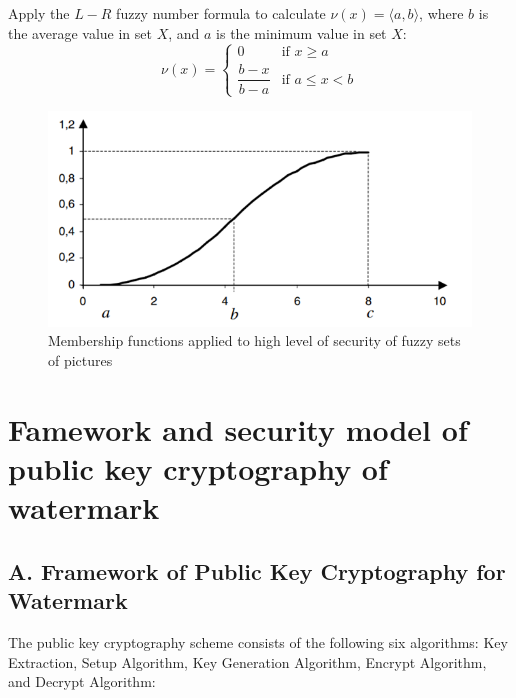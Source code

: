\documentclass[graybox]{svmult}
\begin{document}
\begin{enumerate}[label=(\roman*), itemsep=1em]
          Apply the \( L - R \) fuzzy number formula to calculate \( \nu(x) = \langle a, b \rangle \), where \( b \) is the average value in set \( X \), and \( a \) is the minimum value in set \( X \):
          \[
              \nu(x) = \begin{cases}
                  0                & \text{if } x \geq a     \\
                  \dfrac{b-x}{b-a} & \text{if } a \leq x < b
              \end{cases}
          \]

\end{enumerate}


\begin{figure}[H]
    \centering
    \includegraphics[width=\textwidth]{Figure1.png} %
    \caption{Membership functions applied to high level of security of fuzzy sets of pictures}
    \label{fig:membership-functions-security}
\end{figure}


\section{Famework and security model of public key cryptography of watermark}
\subsection*{A. Framework of Public Key Cryptography for Watermark}

The public key cryptography scheme consists of the following six algorithms: Key Extraction, Setup Algorithm, Key Generation Algorithm, Encrypt Algorithm, and Decrypt Algorithm:
\end{document}
